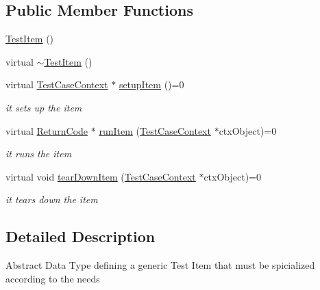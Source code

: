 \subsection*{Public Member Functions}
\begin{DoxyCompactItemize}
\item 
\hyperlink{classit_1_1testbench_1_1data_1_1TestItem_a6117e22d5145b5bb3bc1d8c38196c2ed}{Test\-Item} ()
\item 
virtual \hyperlink{classit_1_1testbench_1_1data_1_1TestItem_a8fecf1f19f13db16f86d03f7001e4a5b}{$\sim$\-Test\-Item} ()
\item 
virtual \hyperlink{classit_1_1testbench_1_1data_1_1TestCaseContext}{Test\-Case\-Context} $\ast$ \hyperlink{classit_1_1testbench_1_1data_1_1TestItem_aebfaa97f910f8ae6ae30bb53f8482146}{setup\-Item} ()=0
\begin{DoxyCompactList}\small\item\em it sets up the item \end{DoxyCompactList}\item 
virtual \hyperlink{structit_1_1testbench_1_1data_1_1ReturnCode}{Return\-Code} $\ast$ \hyperlink{classit_1_1testbench_1_1data_1_1TestItem_af4b65abc4563758162a88ef78716fc2f}{run\-Item} (\hyperlink{classit_1_1testbench_1_1data_1_1TestCaseContext}{Test\-Case\-Context} $\ast$ctx\-Object)=0
\begin{DoxyCompactList}\small\item\em it runs the item \end{DoxyCompactList}\item 
virtual void \hyperlink{classit_1_1testbench_1_1data_1_1TestItem_a07ca5c2f3aec0a021e4731125f77877a}{tear\-Down\-Item} (\hyperlink{classit_1_1testbench_1_1data_1_1TestCaseContext}{Test\-Case\-Context} $\ast$ctx\-Object)=0
\begin{DoxyCompactList}\small\item\em it tears down the item \end{DoxyCompactList}\end{DoxyCompactItemize}


\subsection{Detailed Description}
Abstract Data Type defining a generic Test Item that must be spicialized according to the needs 

